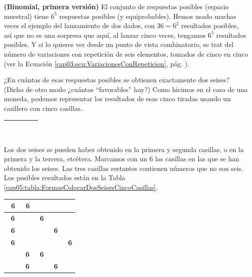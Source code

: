 \begin{Ejemplo}{\bf (Binomial, primera versión)}
\label{ejem:BinomialDosSeisesCuatroTiradas}
    El conjunto de respuestas posibles (espacio muestral) tiene $6^5$ respuestas posibles (y equiprobables). Hemos usado muchas veces el ejemplo del lanzamiento de dos dados, con $36=6^2$ resultados posibles, así que no es una sorpresa que aquí, al lanzar cinco veces, tengamos $6^5$ resultados posibles. Y si lo quieres ver desde un punto de vista combinatorio, se trat del número de variaciones con repetición de seis elementos, tomados de cinco en cinco (ver la Ecuación \ref{cap03:ecu:VariacionesConRepeticion}, pág. \pageref{cap03:ecu:VariacionesConRepeticion}).

    ¿En cuántas de esas respuestas posibles se obtienen exactamente dos seises? (Dicho de otro modo ¿cuántas ``favorables'' hay?) Como hicimos en el caso de una moneda, podemos representar los resultados de esas cinco tiradas usando un casillero con cinco casillas.
    \begin{center}
    \begin{tabular}{|c|c|c|c|c|}
    \hline
    \rule{0cm}{0.5cm}\rule{0.3cm}{0cm}&\rule{0.3cm}{0cm}&\rule{0.3cm}{0cm} &\rule{0.3cm}{0cm}&\rule{0.3cm}{0cm}\\
    \hline
    \end{tabular}
    \end{center}
    Los dos seises se pueden haber obtenido en la primera y segunda casillas, o en la primera y la tercera, etcétera. Marcamos con un $6$ las casillas en las que se han obtenido los seises. Las tres casillas restantes contienen números que no son seis. Los posibles resultados están en la Tabla \ref{cap05:tabla:FormasColocarDosSeisesCincoCasillas}.
        \begin{table}[ht]
        \begin{center}
        {
        \begin{tabular}{|c|c|c|c|c|}
        \hline
         \mbox{ \bf 6}&\mbox{ \bf 6}& & & \\
        \hline
         \mbox{ \bf 6}&& \mbox{ \bf 6}& & \\
        \hline
         \mbox{ \bf 6}&& &\mbox{ \bf 6} & \\
        \hline
         \mbox{ \bf 6}&& & &\mbox{ \bf 6} \\
        \hline
         &\mbox{ \bf 6}& \mbox{ \bf 6}& & \\
        \hline
         &\mbox{ \bf 6}& &\mbox{ \bf 6} & \\
        \hline

\end{tabular}}
\end{center}
\end{table}
\end{Ejemplo}
